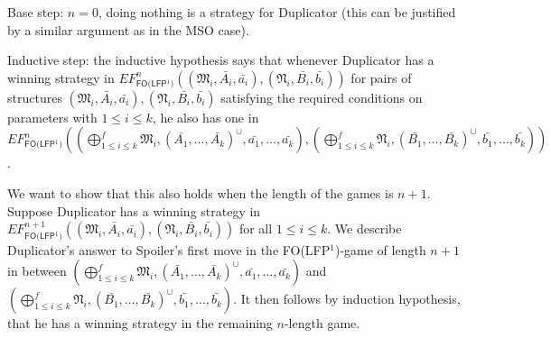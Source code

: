 \documentclass{LMCS}
\newcommand{\frM}{\mathfrak{M}}
\newcommand{\frN}{\mathfrak{N}}
\newcommand{\mso}{\textsf{MSO}\xspace}
\newcommand{\folfp}{\textsf{FO(LFP$^1$)}\xspace}
\begin{document}
Base step: $n=0$, doing nothing is a strategy for Duplicator (this can be justified by a similar argument as in the \mso case).

Inductive step: the inductive hypothesis says that whenever Duplicator has a winning strategy
in
$EF_\folfp^n((\frM_i,\bar{A_i},\bar{a_i}),(\frN_i,\bar{B_i},\bar{b_i}))$
for pairs of structures
$(\frM_i,\bar{A_i},\bar{a_i}),(\frN_i,\bar{B_i},\bar{b_i})$
satisfying the required conditions on parameters with $1 \leq i\leq
k$, he also has one in $EF_\folfp^n((\bigoplus_{1\leq i\leq
k}^f
\frM_i,(\bar{A_1},\ldots,\bar{A_k})^\cup,\bar{a_1},\ldots,\bar{a_k}),
(\bigoplus_{ 1 \leq i \leq k}^f \frN_i,
(\bar{B_1},\ldots,\bar{B_k})^\cup,\bar{b_1},\ldots,\bar{b_k}))$.

We want to show that this also holds when the length of the games
is $n+1$. Suppose Duplicator has a winning strategy in
$EF_\folfp^{n+1}((\frM_i,\bar{A_i},\bar{a_i}),(\frN_i,\bar{B_i},\bar{b_i}))$
for all $1 \leq i\leq k$. We describe Duplicator's answer to
Spoiler's first move in the \folfp-game of length $n+1$ in between $(\bigoplus_{1\leq i\leq
k}^f \frM_i,(\bar{A_1},\ldots,\bar{A_k})^\cup,
\bar{a_1},\ldots,\bar{a_k})$ and $(\bigoplus_{1\leq i\leq k}^f
\frN_i,(\bar{B_1},\ldots,\bar{B_k})^\cup,
\bar{b_1},\ldots,\bar{b_k})$. It then follows by induction
hypothesis, that he has a winning strategy in the remaining
$n$-length game.
\end{document}
